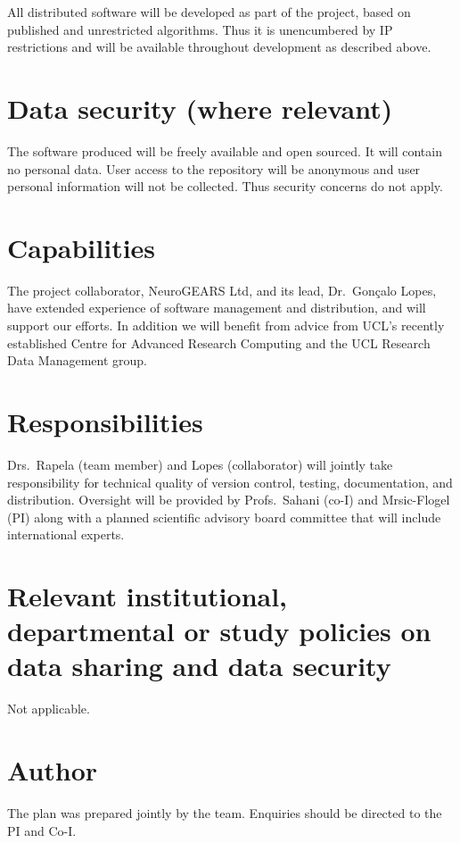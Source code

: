 \documentclass[a4paper,11pt]{article}
\begin{document}
All distributed software will be developed as part of the project, based on published and unrestricted algorithms.  Thus it is unencumbered by IP restrictions and will be available throughout development as described above.

\section{Data security (where relevant)}

The software produced will be freely available and open sourced.  It will contain no personal data.  User access to the repository will be anonymous and user personal information will not be collected.  Thus security concerns do not apply.

\section{Capabilities}

The project collaborator, NeuroGEARS Ltd, and its lead, Dr.~Gon\c{c}alo Lopes,
have extended experience of software management and distribution, and will
support our efforts.  In addition we will benefit from advice from UCL's
recently established Centre for Advanced Research Computing and the UCL
Research Data Management group.

\section{Responsibilities}

Drs.~Rapela (team member) and Lopes (collaborator) will jointly take responsibility for technical quality of version control, testing, documentation, and distribution.  Oversight will be provided by Profs.~Sahani (co-I) and Mrsic-Flogel (PI) along with a planned scientific advisory board committee that will include international experts.


\section{Relevant institutional, departmental or study policies on data sharing and data security}

Not applicable.

\section{Author}

The plan was prepared jointly by the team.  Enquiries should be directed to the PI and Co-I.
\end{document}
